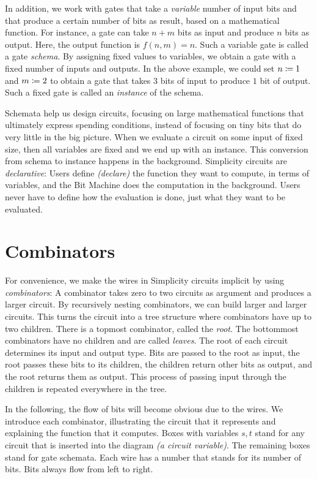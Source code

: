 In addition,
we work with gates that take a \emph{variable} number of input bits
and that produce a certain number of bits as result,
based on a mathematical function.
For instance,
a gate can take $n + m$ bits as input and produce $n$ bits as output.
Here,
the output function is $f(n, m) = n$.
Such a variable gate is called a gate \emph{schema}.
%
By assigning fixed values to variables,
we obtain a gate with a fixed number of inputs and outputs.
In the above example,
we could set $n \coloneqq 1$ and $m \coloneqq 2$
to obtain a gate that takes 3 bits of input to produce $1$ bit of output.
Such a fixed gate is called an \emph{instance} of the schema.

Schemata help us design circuits,
focusing on large mathematical functions that ultimately express spending conditions,
instead of focusing on tiny bits that do very little in the big picture.
When we evaluate a circuit on some input of fixed size,
then all variables are fixed and we end up with an instance.
This conversion from schema to instance happens in the background.
%
Simplicity circuits are \emph{declarative}:
Users define \emph{(declare)} the function they want to compute,
in terms of variables,
and the Bit Machine does the computation in the background.
Users never have to define how the evaluation is done,
just what they want to be evaluated.

\section{Combinators}%
\label{sec:combinators}

For convenience,
we make the wires in Simplicity circuits implicit by using \emph{combinators}:
A combinator takes zero to two circuits as argument and produces a larger circuit.
By recursively nesting combinators,
we can build larger and larger circuits.
%
This turns the circuit into a tree structure where combinators have up to two children.
There is a topmost combinator,
called the \emph{root}.
The bottommost combinators have no children and are called \emph{leaves}.
%
The root of each circuit determines its input and output type.
Bits are passed to the root as input,
the root passes these bits to its children,
the children return other bits as output,
and the root returns them as output.
This process of passing input through the children is repeated everywhere in the tree.

In the following,
the flow of bits will become obvious due to the wires.
We introduce each combinator,
illustrating the circuit that it represents
and explaining the function that it computes.
Boxes with variables $s, t$ stand for any circuit that is inserted into the diagram \emph{(a circuit variable)}.
The remaining boxes stand for gate schemata.
Each wire has a number that stands for its number of bits.
Bits always flow from left to right.

